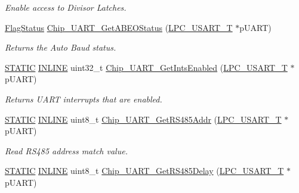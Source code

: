 \begin{DoxyCompactItemize}
\begin{DoxyCompactList}\small\item\em Enable access to Divisor Latches. \end{DoxyCompactList}\item 
\hyperlink{group__LPC__Types__Public__Types_ga89136caac2e14c55151f527ac02daaff}{Flag\+Status} \hyperlink{group__UART__17XX__40XX_ga6d1d74a73290b145868a88e6b5635093}{Chip\+\_\+\+U\+A\+R\+T\+\_\+\+Get\+A\+B\+E\+O\+Status} (\hyperlink{structLPC__USART__T}{L\+P\+C\+\_\+\+U\+S\+A\+R\+T\+\_\+T} $\ast$p\+U\+A\+RT)
\begin{DoxyCompactList}\small\item\em Returns the Auto Baud status. \end{DoxyCompactList}\item 
\hyperlink{group__LPC__Types__Public__Macros_ga10b2d890d871e1489bb02b7e70d9bdfb}{S\+T\+A\+T\+IC} \hyperlink{group__LPC__Types__Public__Types_ga2eb6f9e0395b47b8d5e3eeae4fe0c116}{I\+N\+L\+I\+NE} uint32\+\_\+t \hyperlink{group__UART__17XX__40XX_ga090e960cbbcc79be17bf52a52ec3595c}{Chip\+\_\+\+U\+A\+R\+T\+\_\+\+Get\+Ints\+Enabled} (\hyperlink{structLPC__USART__T}{L\+P\+C\+\_\+\+U\+S\+A\+R\+T\+\_\+T} $\ast$p\+U\+A\+RT)
\begin{DoxyCompactList}\small\item\em Returns U\+A\+RT interrupts that are enabled. \end{DoxyCompactList}\item 
\hyperlink{group__LPC__Types__Public__Macros_ga10b2d890d871e1489bb02b7e70d9bdfb}{S\+T\+A\+T\+IC} \hyperlink{group__LPC__Types__Public__Types_ga2eb6f9e0395b47b8d5e3eeae4fe0c116}{I\+N\+L\+I\+NE} uint8\+\_\+t \hyperlink{group__UART__17XX__40XX_ga1c96142bb767ca604ad468977c5e546c}{Chip\+\_\+\+U\+A\+R\+T\+\_\+\+Get\+R\+S485\+Addr} (\hyperlink{structLPC__USART__T}{L\+P\+C\+\_\+\+U\+S\+A\+R\+T\+\_\+T} $\ast$p\+U\+A\+RT)
\begin{DoxyCompactList}\small\item\em Read R\+S485 address match value. \end{DoxyCompactList}\item 
\hyperlink{group__LPC__Types__Public__Macros_ga10b2d890d871e1489bb02b7e70d9bdfb}{S\+T\+A\+T\+IC} \hyperlink{group__LPC__Types__Public__Types_ga2eb6f9e0395b47b8d5e3eeae4fe0c116}{I\+N\+L\+I\+NE} uint8\+\_\+t \hyperlink{group__UART__17XX__40XX_ga5394200f985c69d25fd0c7434588cf88}{Chip\+\_\+\+U\+A\+R\+T\+\_\+\+Get\+R\+S485\+Delay} (\hyperlink{structLPC__USART__T}{L\+P\+C\+\_\+\+U\+S\+A\+R\+T\+\_\+T} $\ast$p\+U\+A\+RT)

\end{DoxyCompactItemize}
